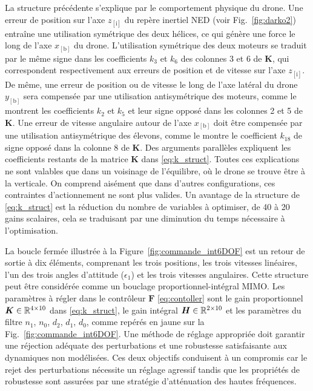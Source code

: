 La structure précédente s'explique par le comportement physique du drone. Une erreur de position sur l'axe $z_{[\text{i}]}$ du repère inertiel NED (voir Fig.~\ref{fig:darko2}) entraîne une utilisation symétrique des deux hélices, ce qui génère une force le long de l'axe $x_{[\text{b}]}$ du drone. L'utilisation symétrique des deux moteurs se traduit par le même signe dans les coefficients $k_{3}$ et $k_{6}$ des colonnes 3 et 6 de $\boldsymbol{K}$, qui correspondent respectivement aux erreurs de position et de vitesse sur l'axe $z_{[\text{i}]}$. De même, une erreur de position ou de vitesse le long de l'axe latéral du drone $y_{[\text{b}]}$ sera compensée par une utilisation antisymétrique des moteurs, comme le montrent les coefficients $k_{2}$ et $k_{5}$ et leur signe opposé dans les colonnes 2 et 5 de $\boldsymbol{K}$. Une erreur de vitesse angulaire autour de l'axe $x_{[\text{b}]}$ doit être compensée par une utilisation antisymétrique des élevons, comme le montre le coefficient $k_{18}$ de signe opposé dans la colonne 8 de $\boldsymbol{K}$. Des arguments parallèles expliquent les coefficients restants de la matrice $\boldsymbol{K}$ dans \eqref{eq:k_struct}. Toutes ces explications ne sont valables que dans un voisinage de l'équilibre, où le drone se trouve être à la verticale. On comprend aisément que dans d'autres configurations, ces contraintes d'actionnement ne sont plus valides. Un avantage de la structure de \eqref{eq:k_struct} est la réduction du nombre de variables à optimiser, de 40 à 20 gains scalaires, cela se traduisant par une diminution du temps nécessaire à l'optimisation.

La boucle fermée illustrée à la Figure~\ref{fig:commande_int6DOF} est un retour de sortie à dix éléments, comprenant les trois positions, les trois vitesses linéaires, l'un des trois angles d'attitude ($\epsilon_{1}$) et les trois vitesses angulaires. Cette structure peut être considérée comme un bouclage proportionnel-intégral MIMO. Les paramètres à régler dans le contrôleur $\boldsymbol{F}$ \eqref{eq:contoller} sont le gain proportionnel $\boldsymbol{K} \in {\mathbb R}^{4\times10}$ dans \eqref{eq:k_struct}, le gain intégral $\boldsymbol{H} \in {\mathbb R}^{2\times10}$ et les paramètres du filtre $n_1$, $n_0$, $d_2$, $d_1$, $d_0$, comme repérés en jaune sur la Fig.~\ref{fig:commande_int6DOF}. Une méthode de réglage appropriée doit garantir une réjection adéquate des perturbations et une robustesse satisfaisante aux dynamiques non modélisées. Ces deux objectifs conduisent à un compromis car le rejet des perturbations nécessite un réglage agressif tandis que les propriétés de robustesse sont assurées par une stratégie d'atténuation des hautes fréquences.

